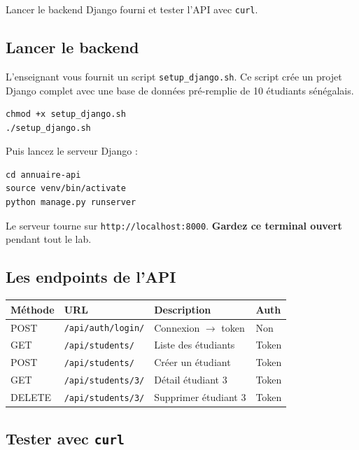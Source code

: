 \documentclass[11pt,a4paper]{article}
\begin{document}
\begin{objectifbox}
Lancer le backend Django fourni et tester l'API avec \texttt{curl}.
\end{objectifbox}

\subsection{Lancer le backend}

L'enseignant vous fournit un script \texttt{setup\_django.sh}. Ce script crée un projet Django complet avec une base de données pré-remplie de 10 étudiants sénégalais.

\begin{lstlisting}[style=terminal]
chmod +x setup_django.sh
./setup_django.sh
\end{lstlisting}

Puis lancez le serveur Django :

\begin{lstlisting}[style=terminal]
cd annuaire-api
source venv/bin/activate
python manage.py runserver
\end{lstlisting}

Le serveur tourne sur \texttt{http://localhost:8000}. \textbf{Gardez ce terminal ouvert} pendant tout le lab.

\subsection{Les endpoints de l'API}

\begin{center}
\begin{tabular}{llp{4.5cm}l}
\toprule
\textbf{Méthode} & \textbf{URL} & \textbf{Description} & \textbf{Auth} \\
\midrule
POST & \texttt{/api/auth/login/} & Connexion $\to$ token & Non \\
GET & \texttt{/api/students/} & Liste des étudiants & Token \\
POST & \texttt{/api/students/} & Créer un étudiant & Token \\
GET & \texttt{/api/students/3/} & Détail étudiant 3 & Token \\
DELETE & \texttt{/api/students/3/} & Supprimer étudiant 3 & Token \\
\bottomrule
\end{tabular}
\end{center}

\subsection{Tester avec \texttt{curl}}
\end{document}

